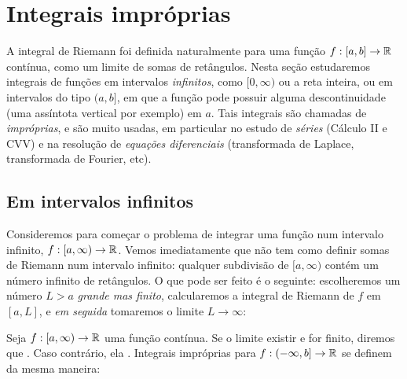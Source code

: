 

\chapter{Integrais impróprias}\label{CAP:Improprias}

\ifdefined\updateans
\fi

A integral de Riemann foi definida naturalmente para uma função $f:[a,b]\to \mathbb{R}$
contínua, como um limite de somas de retângulos. 
Nesta seção estudaremos integrais de funções em intervalos \emph{infinitos}, 
como $[0,\infty)$ ou a reta inteira, ou em intervalos do tipo $(a,b]$, em que a
função pode possuir alguma descontinuidade (uma assíntota vertical por exemplo)
em $a$. Tais integrais são chamadas de \emph{impróprias}, e são muito usadas,
em particular no estudo de \emph{séries} (Cálculo II e CVV) e na
resolução de \emph{equações diferenciais} (transformada de Laplace,
transformada de Fourier, etc).

\section{Em intervalos infinitos}
Consideremos para começar o problema de integrar uma função num
intervalo infinito, $f:[a,\infty)\to \mathbb{R}$.
Vemos imediatamente que não tem como definir somas de Riemann num intervalo
infinito: qualquer subdivisão de $[a,\infty)$ contém um número
infinito de retângulos. O que pode ser feito é o seguinte:
escolheremos um número $L>a$
\emph{grande mas finito}, calcularemos a integral de Riemann de $f$ em $[a,L]$,
e \emph{em seguida} tomaremos o limite $L\to \infty$:

\begin{defin}
Seja $f:[a,\infty)\to \mathbb{R}$ uma função contínua. Se o limite 
existir e for finito, diremos que . Caso contrário, ela .
Integrais impróprias para $f:(-\infty,b]\to \mathbb{R}$ se definem da mesma maneira:
\end{defin}


